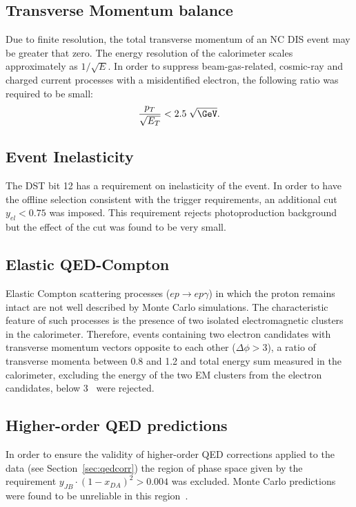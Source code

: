 \subsection{Transverse Momentum balance}
\label{subsec:empzcut}
Due to finite resolution, the total transverse momentum of an NC DIS event may be greater that zero. The energy resolution of the calorimeter scales approximately as $1/\sqrt{E}$. In order to suppress beam-gas-related, cosmic-ray and charged current processes with a misidentified electron, the following ratio was required to be small:
\begin{equation}
\frac{p_T}{\sqrt{E_T}} < 2.5\;\sqrt{\GeV}.
\label{eq:ptcut}
\end{equation}

\subsection{Event Inelasticity}
\label{subsec:yelcut}

The DST bit 12 has a requirement on inelasticity of the event. In order to have the offline selection consistent with the trigger requirements, an additional cut $y_{el} < 0.75$ was imposed. This requirement rejects photoproduction background but the effect of the cut was found to be very small.

\subsection{Elastic QED-Compton}
\label{subsec:elasticqedcut}
Elastic Compton scattering processes ($ep \rightarrow ep\gamma$) in which the proton remains intact are not well described by Monte Carlo simulations. The characteristic feature of such processes is the presence of two isolated electromagnetic clusters in the calorimeter. Therefore, events containing two electron candidates with transverse momentum vectors opposite to each other ($\Delta\phi > 3$), a ratio of transverse momenta between 0.8 and 1.2 and total energy sum measured in the calorimeter, excluding the energy of the two EM clusters from the electron candidates, below 3 \GeV~were rejected.

\subsection{Higher-order QED predictions}
\label{subsec:qedcorcut}
In order to ensure the validity of higher-order QED corrections applied to the data (see Section~\ref{sec:qedcorr}) the region of phase space given by the requirement $y_{JB}\cdot\left(1-x_{DA}\right)^2>0.004$ was excluded. Monte Carlo predictions were found to be unreliable in this region~\cite{cpc:81:381}.

